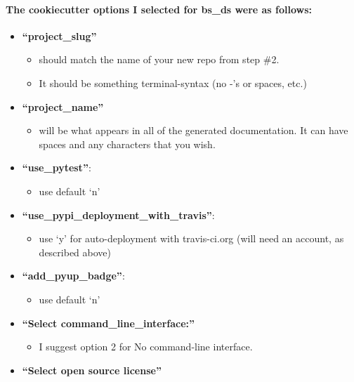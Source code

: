 \documentclass[11pt]{article}
\providecommand{\tightlist}{%
      \setlength{\itemsep}{0pt}\setlength{\parskip}{0pt}}
\begin{document}
\hypertarget{the-cookiecutter-options-i-selected-for-bs_ds-were-as-follows}{%
\paragraph{The cookiecutter options I selected for bs\_ds were as
follows:}\label{the-cookiecutter-options-i-selected-for-bs_ds-were-as-follows}}

\begin{itemize}
\tightlist
\item
  \textbf{``project\_slug''}

  \begin{itemize}
  \tightlist
  \item
    should match the name of your new repo from step \#2.
  \item
    It should be something terminal-syntax (no -'s or spaces, etc.)
  \end{itemize}
\item
  \textbf{``project\_name''}

  \begin{itemize}
  \tightlist
  \item
    will be what appears in all of the generated documentation. It can
    have spaces and any characters that you wish.
  \end{itemize}
\item
  \textbf{``use\_pytest''}:

  \begin{itemize}
  \tightlist
  \item
    use default `n'
  \end{itemize}
\item
  \textbf{``use\_pypi\_deployment\_with\_travis''}:

  \begin{itemize}
  \tightlist
  \item
    use `y' for auto-deployment with travis-ci.org (will need an
    account, as described above)
  \end{itemize}
\item
  \textbf{``add\_pyup\_badge''}:

  \begin{itemize}
  \tightlist
  \item
    use default `n'
  \end{itemize}
\item
  \textbf{``Select command\_line\_interface:''}

  \begin{itemize}
  \tightlist
  \item
    I suggest option 2 for No command-line interface.
  \end{itemize}
\item
  \textbf{``Select open source license''}


\end{itemize}
\end{document}
